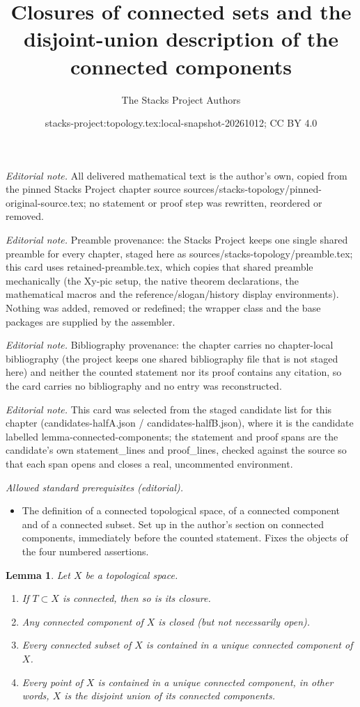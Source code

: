 \documentclass[10pt,a4paper]{amsart}
\title{Closures of connected sets and the disjoint-union description of the connected components}
\author{The Stacks Project Authors}
\date{stacks-project:topology.tex:local-snapshot-20261012; CC BY 4.0}
\theoremstyle{plain}
\newtheorem{lemma}[subsection]{Lemma}
\theoremstyle{definition}
\theoremstyle{remark}
\numberwithin{equation}{subsection}
\begin{document}
\maketitle
\noindent\textit{Editorial note.} All delivered mathematical text is the author's own, copied from the pinned Stacks Project chapter source sources/stacks-topology/pinned-original-source.tex; no statement or proof step was rewritten, reordered or removed.\par\medskip
\noindent\textit{Editorial note.} Preamble provenance: the Stacks Project keeps one single shared preamble for every chapter, staged here as sources/stacks-topology/preamble.tex; this card uses retained-preamble.tex, which copies that shared preamble mechanically (the Xy-pic setup, the native theorem declarations, the mathematical macros and the reference/slogan/history display environments). Nothing was added, removed or redefined; the wrapper class and the base packages are supplied by the assembler.\par\medskip
\noindent\textit{Editorial note.} Bibliography provenance: the chapter carries no chapter-local bibliography (the project keeps one shared bibliography file that is not staged here) and neither the counted statement nor its proof contains any citation, so the card carries no bibliography and no entry was reconstructed.\par\medskip
\noindent\textit{Editorial note.} This card was selected from the staged candidate list for this chapter (candidates-halfA.json / candidates-halfB.json), where it is the candidate labelled lemma-connected-components; the statement and proof spans are the candidate's own statement\_lines and proof\_lines, checked against the source so that each span opens and closes a real, uncommented environment.\par\medskip
\noindent\textit{Allowed standard prerequisites (editorial).}\begin{itemize}
\item The definition of a connected topological space, of a connected component and of a connected subset. Set up in the author's section on connected components, immediately before the counted statement. Fixes the objects of the four numbered assertions.
\end{itemize}\medskip
\begin{lemma}
\label{lemma-connected-components}
Let $X$ be a topological space.
\begin{enumerate}
\item If $T \subset X$ is connected, then so is its closure.
\item Any connected component of $X$ is closed (but not necessarily open).
\item Every connected subset of $X$ is contained in a unique connected
component of $X$.
\item Every point of $X$ is contained in a unique connected component, in other
words, $X$ is the disjoint union of its connected components.
\end{enumerate}
\end{lemma}
\end{document}

